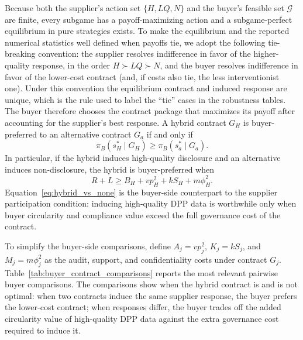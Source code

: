 \documentclass[final,5p,times,authoryear]{elsarticle}
\begin{document}
Because both the supplier's action set $\{H,LQ,N\}$ and the buyer's feasible set $\mathcal{G}$ are finite, every subgame has a payoff-maximizing action and a subgame-perfect equilibrium in pure strategies exists. To make the equilibrium and the reported numerical statistics well defined when payoffs tie, we adopt the following tie-breaking convention: the supplier resolves indifference in favor of the higher-quality response, in the order $H\succ LQ\succ N$, and the buyer resolves indifference in favor of the lower-cost contract (and, if costs also tie, the less interventionist one). Under this convention the equilibrium contract and induced response are unique, which is the rule used to label the ``tie'' cases in the robustness tables. The buyer therefore chooses the contract package that maximizes its payoff after accounting for the supplier's best response. A hybrid contract $G_H$ is buyer-preferred to an alternative contract $G_a$ if and only if
\begin{equation}
\pi_B(s_H^*\mid G_H)\geq \pi_B(s_a^*\mid G_a).
\end{equation}
In particular, if the hybrid induces high-quality disclosure and an alternative induces non-disclosure, the hybrid is buyer-preferred when
\begin{equation}
R+L\geq B_H+v p_H^2+kS_H+m\phi_H^2.
\label{eq:hybrid_vs_none}
\end{equation}
Equation~\ref{eq:hybrid_vs_none} is the buyer-side counterpart to the supplier participation condition: inducing high-quality DPP data is worthwhile only when buyer circularity and compliance value exceed the full governance cost of the contract.

To simplify the buyer-side comparisons, define $A_j=vp_j^2$, $K_j=kS_j$, and $M_j=m\phi_j^2$ as the audit, support, and confidentiality costs under contract $G_j$. Table~\ref{tab:buyer_contract_comparisons} reports the most relevant pairwise buyer comparisons. The comparisons show when the hybrid contract is and is not optimal: when two contracts induce the same supplier response, the buyer prefers the lower-cost contract; when responses differ, the buyer trades off the added circularity value of high-quality DPP data against the extra governance cost required to induce it.
\end{document}
